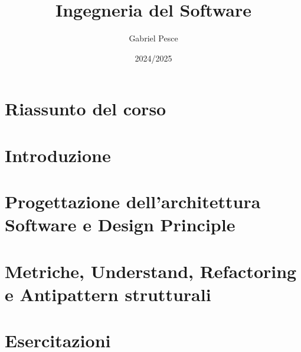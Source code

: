 \documentclass{article}
\newcommand{\mysectionformatted}[1]{\section[#1]{\centering \Huge #1}}
\begin{document}
\title{Ingegneria del Software}
\author{Gabriel Pesce}
\date{2024/2025}

\maketitle
\newpage

\tableofcontents
\newpage

\mysectionformatted{Riassunto del corso}



\mysectionformatted{Introduzione}


\mysectionformatted{Progettazione dell'architettura Software e Design Principle}


\mysectionformatted{Metriche, Understand, Refactoring e Antipattern strutturali}


\mysectionformatted{Esercitazioni}

\end{document}
